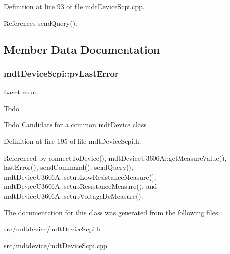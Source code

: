 Definition at line 93 of file mdt\-Device\-Scpi.\-cpp.



References send\-Query().



\subsection{Member Data Documentation}
\hypertarget{classmdt_device_scpi_a3dd77a6f3aeae13cea5b419185147864}{
\subsubsection[{pv\-Last\-Error}]{ mdt\-Device\-Scpi\-::pv\-Last\-Error\hspace{0.3cm}{\ttfamily [protected]}}}\label{classmdt_device_scpi_a3dd77a6f3aeae13cea5b419185147864}


Laset error. 

\begin{DoxyRefDesc}{Todo}
\item[\hyperlink{todo__todo000021}{Todo}]Candidate for a common \hyperlink{classmdt_device}{mdt\-Device} class \end{DoxyRefDesc}


Definition at line 195 of file mdt\-Device\-Scpi.\-h.



Referenced by connect\-To\-Device(), mdt\-Device\-U3606\-A\-::get\-Measure\-Value(), last\-Error(), send\-Command(), send\-Query(), mdt\-Device\-U3606\-A\-::setup\-Low\-Resistance\-Measure(), mdt\-Device\-U3606\-A\-::setup\-Resistance\-Measure(), and mdt\-Device\-U3606\-A\-::setup\-Voltage\-Dc\-Measure().



The documentation for this class was generated from the following files\-:\begin{DoxyCompactItemize}
\item 
src/mdtdevice/\hyperlink{mdt_device_scpi_8h}{mdt\-Device\-Scpi.\-h}\item 
src/mdtdevice/\hyperlink{mdt_device_scpi_8cpp}{mdt\-Device\-Scpi.\-cpp}\end{DoxyCompactItemize}

